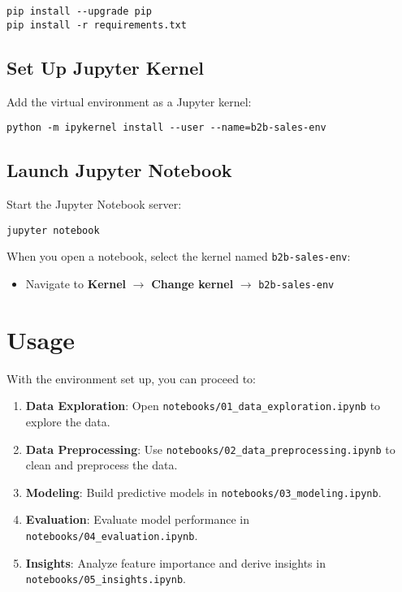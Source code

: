 \documentclass{article}
\begin{document}
\begin{verbatim}
pip install --upgrade pip
pip install -r requirements.txt
\end{verbatim}

\subsection{Set Up Jupyter Kernel}

Add the virtual environment as a Jupyter kernel:

\begin{verbatim}
python -m ipykernel install --user --name=b2b-sales-env
\end{verbatim}

\subsection{Launch Jupyter Notebook}

Start the Jupyter Notebook server:

\begin{verbatim}
jupyter notebook
\end{verbatim}

When you open a notebook, select the kernel named \verb|b2b-sales-env|:

\begin{itemize}
    \item Navigate to \textbf{Kernel} $\rightarrow$ \textbf{Change kernel} $\rightarrow$ \verb|b2b-sales-env|
\end{itemize}

\section{Usage}

With the environment set up, you can proceed to:

\begin{enumerate}
    \item \textbf{Data Exploration}: Open \verb|notebooks/01_data_exploration.ipynb| to explore the data.
    \item \textbf{Data Preprocessing}: Use \verb|notebooks/02_data_preprocessing.ipynb| to clean and preprocess the data.
    \item \textbf{Modeling}: Build predictive models in \verb|notebooks/03_modeling.ipynb|.
    \item \textbf{Evaluation}: Evaluate model performance in \verb|notebooks/04_evaluation.ipynb|.
    \item \textbf{Insights}: Analyze feature importance and derive insights in \verb|notebooks/05_insights.ipynb|.
\end{enumerate}
\end{document}
